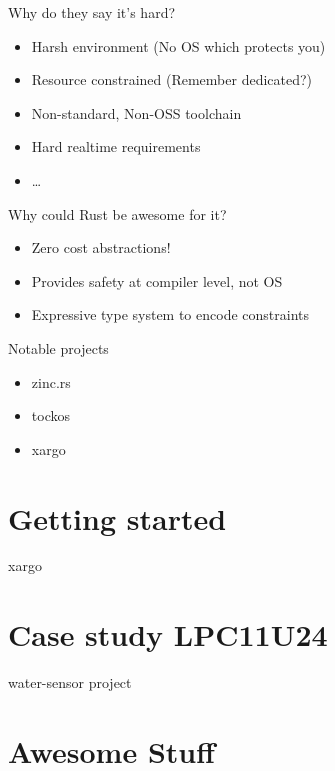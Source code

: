 \documentclass[aspectratio=1610,14pt,t]{beamer}
\begin{document}
\begin{frame}[c]{Why do they say it's hard?}
  \begin{itemize}
    \item Harsh environment (No OS which protects you)
    \item Resource constrained (Remember dedicated?)
    \item Non-standard, Non-OSS toolchain
    \item Hard realtime requirements
    \item \ldots
  \end{itemize}
\end{frame}

\begin{frame}[c]{Why could Rust be awesome for it?}
  \begin{itemize}
    \item Zero cost abstractions!
    \item Provides safety at compiler level, not OS
    \item Expressive type system to encode constraints
  \end{itemize}
\end{frame}

\begin{frame}[c]{Notable projects}
  \begin{itemize}
    \item zinc.rs
    \item tockos
    \item xargo
  \end{itemize}
\end{frame}


\section{Getting started}

\begin{frame}[c]{xargo}
\end{frame}

\section{Case study LPC11U24}

\begin{frame}[c]{water-sensor project}
\end{frame}

\section{Awesome Stuff}
\end{document}
